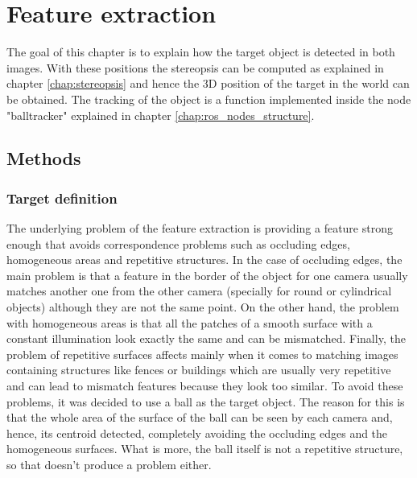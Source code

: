 \chapter{Feature extraction} %
\label{chap:feature_extraction}
The goal of this chapter is to explain how the target object is detected in both images. With these positions the stereopsis can be computed as explained in chapter \ref{chap:stereopsis} and hence the 3D position of the target in the world can be obtained.
The tracking of the object is a function implemented inside the node "balltracker" explained in chapter \ref{chap:ros_nodes_structure}.

\section{Methods}

\subsection{Target definition}
The underlying problem of the feature extraction is providing a feature strong enough that avoids correspondence problems such as occluding edges, homogeneous areas and repetitive structures.
In the case of occluding edges, the main problem is that a feature in the border of the object for one camera usually matches another one from the other camera (specially for round or cylindrical objects) although they are not the same point.
On the other hand, the problem with homogeneous areas is that all the patches of a smooth surface with a constant illumination look exactly the same and can be mismatched.
Finally, the problem of repetitive surfaces affects mainly when it comes to matching images containing structures like fences or buildings which are usually very repetitive and can lead to mismatch features because they look too similar.
To avoid these problems, it was decided to use a ball as the target object.
The reason for this is that the whole area of the surface of the ball can be seen by each camera and, hence, its centroid detected, completely avoiding the occluding edges and the homogeneous surfaces. What is more, the ball itself is not a repetitive structure, so that doesn't produce a problem either.


